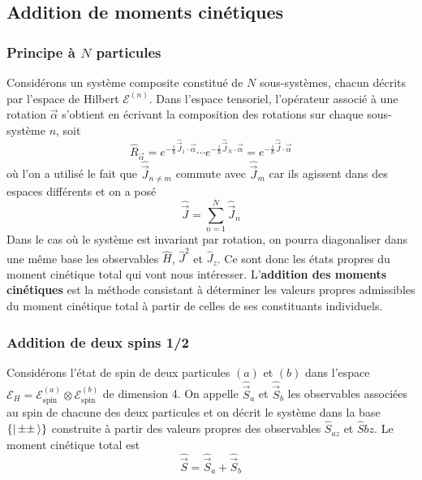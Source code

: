 \subsection{Addition de moments cinétiques}

        \subsubsection{Principe à $N$ particules}

        Considérons un système composite constitué de $N$ sous-systèmes, chacun décrits par l’espace de Hilbert $\mathcal{E}^{(n)}$. Dans l’espace tensoriel, l’opérateur associé à une rotation $\vec{\alpha}$ s’obtient en écrivant la composition des rotations sur chaque sous-système $n$, soit 
        \[ \hat{R}_{\vec{\alpha}} = e^{- \frac{i}{\hbar} \hat{\vec{J}}_1 \cdot \vec{\alpha}} \cdots e^{- \frac{i}{\hbar} \hat{\vec{J}}_N \cdot \vec{\alpha}} = e^{- \frac{i}{\hbar} \hat{\vec{J}} \cdot \vec{\alpha}} \]
        où l’on a utilisé le fait que $\hat{\vec{J}}_{n \neq m}$ commute avec $\hat{\vec{J}}_m$ car ils agissent dans des espaces différents et on a posé 
        \[ \hat{\vec{J}} = \sum_{n = 1}^N \hat{\vec{J}}_n \]
        Dans le cas où le système est invariant par rotation, on pourra diagonaliser dans une même base les observables $\hat{H}$, $\hat{J}^2$ et $\hat{J}_z$. Ce sont donc les états propres du moment cinétique total qui vont nous intéresser. L’\textbf{addition des moments cinétiques} est la méthode consistant à déterminer les valeurs propres admissibles du moment cinétique total à partir de celles de ses constituants individuels. 

        \subsubsection{Addition de deux spins 1/2}

        Considérons l’état de spin de deux particules $(a)$ et $(b)$ dans l’espace $\mathcal{E}_H = \mathcal{E}_{\text{spin}}^{(a)} \otimes \mathcal{E}_{\text{spin}}^{(b)}$ de dimension 4. On appelle $\hat{\vec{S}}_a$ et $\hat{\vec{S}}_b$ les observables associées au spin de chacune des deux particules et on décrit le système dans la base $\left\{\left| \, \pm\pm \, \right>\right\}$ construite à partir des valeurs propres des observables $\hat{S}_{az}$ et $\hat{S}{bz}$. Le moment cinétique total est 
        \[ \hat{\vec{S}} = \hat{\vec{S}}_a + \hat{\vec{S}}_b \]  
        

